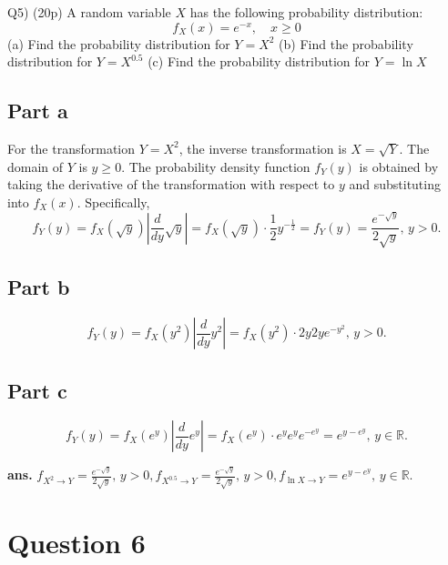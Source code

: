 \documentclass[12pt]{article}
\begin{document}
\begin{q}
Q5) (20p) A random variable \(X\) has the following probability distribution:
\[
f_X(x)=e^{-x}, \quad x \geq 0
\]
(a) Find the probability distribution for \(Y=X^2\)
(b) Find the probability distribution for \(Y=X^{0.5}\)
(c) Find the probability distribution for \(Y=\ln X\)
\end{q}


\subsection*{Part a}
For the transformation \( Y = X^2 \), the inverse transformation is \( X = \sqrt{Y} \). The domain of \( Y \) is \( y \geq 0 \). The probability density function \( f_Y(y) \) is obtained by taking the derivative of the transformation with respect to \( y \) and substituting into \( f_X(x) \). Specifically, 
\[ f_Y(y) = f_X(\sqrt{y}) \left| \frac{d}{dy}\sqrt{y} \right| = f_X(\sqrt{y}) \cdot \frac{1}{2} y^{-\frac{1}{2}} =  f_Y(y) = \frac{e^{-\sqrt{y}}}{2 \sqrt{y}}, \,  y > 0.\]

\subsection*{Part b}

\[ f_Y(y) = f_X(y^2) \left| \frac{d}{dy}y^2 \right| = f_X(y^2) \cdot 2y  2y e^{-y^2}, \,  y > 0 . \]

\subsection*{Part c}

\[ f_Y(y) = f_X(e^y) \left| \frac{d}{dy}e^y \right| = f_X(e^y) \cdot e^y e^y e^{-e^y} = e^{y - e^y}, \, y\in \mathbb{R}. \]



\vfill
\begin{flushright}
\textbf{ans.} \(f_{X^2 \rightarrow Y} = \frac{e^{-\sqrt{y}}}{2 \sqrt{y}}, \,  y > 0, f_{X^{0.5}\rightarrow Y}=\frac{e^{-\sqrt{y}}}{2 \sqrt{y}}, \,  y > 0, f_{\ln{X} \rightarrow Y}=e^{y - e^y}, \, y\in \mathbb{R}.\)
\end{flushright}




\newpage
\section*{Question 6}
\end{document}
